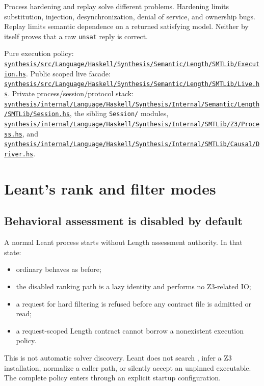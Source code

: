 \documentclass[10pt,letterpaper,oneside]{report}
\newcommand{\code}[1]{\texttt{\detokenize{#1}}}
\newcommand{\filepath}[1]{\nolinkurl{#1}}
\newcommand{\unsat}{\texttt{unsat}}
\def\DjexPinnedCommit{7d65eba6f753727ae7b3d734fb4a7e00f1f44aa7}
\def\DjexBase{https://github.com/VladimirReshetnikov/Djex/blob/\DjexPinnedCommit/}
\newcommand{\dpath}[1]{\href{\DjexBase#1}{\nolinkurl{#1}}}
\begin{document}
\begin{trustbox}
Process hardening and replay solve different problems. Hardening limits substitution, injection, desynchronization, denial of service, and ownership bugs. Replay limits semantic dependence on a returned satisfying model. Neither by itself proves that a raw \unsat{} reply is correct.
\end{trustbox}

\begin{sourcebox}
Pure execution policy: \dpath{synthesis/src/Language/Haskell/Synthesis/Semantic/Length/SMTLib/Execution.hs}. Public scoped live facade: \dpath{synthesis/src/Language/Haskell/Synthesis/Semantic/Length/SMTLib/Live.hs}. Private process/session/protocol stack: \dpath{synthesis/internal/Language/Haskell/Synthesis/Internal/Semantic/Length/SMTLib/Session.hs}, the sibling \filepath{Session/} modules, \dpath{synthesis/internal/Language/Haskell/Synthesis/Internal/SMTLib/Z3/Process.hs}, and \dpath{synthesis/internal/Language/Haskell/Synthesis/Internal/SMTLib/Causal/Driver.hs}.
\end{sourcebox}

\chapter{Leant's rank and filter modes}
\label{chap:leant-modes}

\section{Behavioral assessment is disabled by default}

A normal Leant process starts without Length assessment authority. In that state:

\begin{itemize}
\item ordinary \code{:synth TYPE} behaves as before;
\item the disabled ranking path is a lazy identity and performs no Z3-related IO;
\item a request for hard filtering is refused before any contract file is admitted or read;
\item a request-scoped Length contract cannot borrow a nonexistent execution policy.
\end{itemize}

This is not automatic solver discovery. Leant does not search \code{PATH}, infer a Z3 installation, normalize a caller path, or silently accept an unpinned executable. The complete policy enters through an explicit startup configuration.
\end{document}
